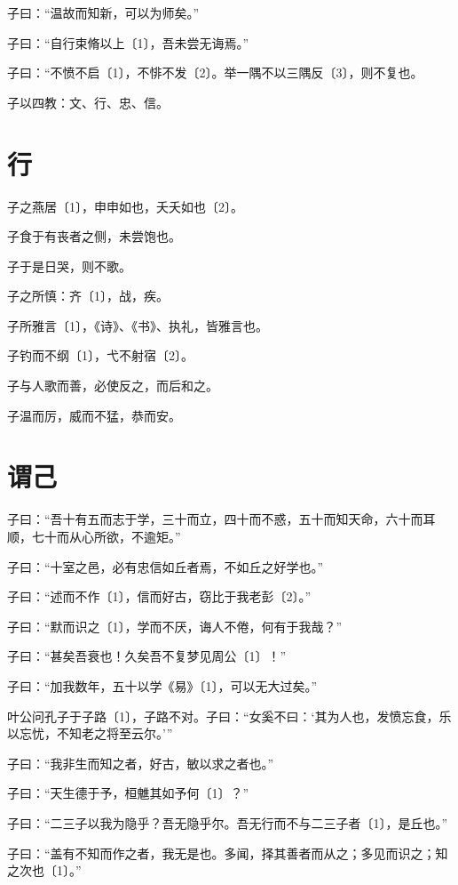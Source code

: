 \documentclass[a5paper]{ctexbook}
\begin{document}
    子曰：“温故而知新，可以为师矣。”

    子曰：“自行束脩以上〔1〕，吾未尝无诲焉。”

    子曰：“不愤不启〔1〕，不悱不发〔2〕。举一隅不以三隅反〔3〕，则不复也。

    子以四教：文、行、忠、信。

    \chapter{行}

    子之燕居〔1〕，申申如也，夭夭如也〔2〕。

    子食于有丧者之侧，未尝饱也。

    子于是日哭，则不歌。

    子之所慎：齐〔1〕，战，疾。

    子所雅言〔1〕，《诗》、《书》、执礼，皆雅言也。

    子钓而不纲〔1〕，弋不射宿〔2〕。

    子与人歌而善，必使反之，而后和之。

    子温而厉，威而不猛，恭而安。

    \chapter{谓己}

    子曰：“吾十有五而志于学，三十而立，四十而不惑，五十而知天命，六十而耳顺，七十而从心所欲，不逾矩。”

    子曰：“十室之邑，必有忠信如丘者焉，不如丘之好学也。”

    子曰：“述而不作〔1〕，信而好古，窃比于我老彭〔2〕。”

    子曰：“默而识之〔1〕，学而不厌，诲人不倦，何有于我哉？”

    子曰：“甚矣吾衰也！久矣吾不复梦见周公〔1〕！”

    子曰：“加我数年，五十以学《易》〔1〕，可以无大过矣。”

    叶公问孔子于子路〔1〕，子路不对。子曰：“女奚不曰：‘其为人也，发愤忘食，乐以忘忧，不知老之将至云尔。’”

    子曰：“我非生而知之者，好古，敏以求之者也。”

    子曰：“天生德于予，桓魋其如予何〔1〕？”

    子曰：“二三子以我为隐乎？吾无隐乎尔。吾无行而不与二三子者〔1〕，是丘也。”

    子曰：“盖有不知而作之者，我无是也。多闻，择其善者而从之；多见而识之；知之次也〔1〕。”
\end{document}
